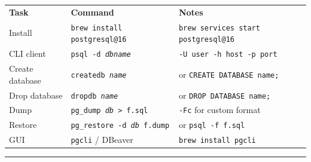 \documentclass[10pt]{extarticle}
\begin{document}
\small


\begin{tabularx}{\linewidth}{@{}l@{\quad}l@{\quad}Y@{}}
\textbf{Task}        & \textbf{Command}                                  & \textbf{Notes} \\[2pt]
Install              & \texttt{brew install postgresql@16}                & \texttt{brew services start postgresql@16} \\
CLI client           & \texttt{psql -d \textit{dbname}}                  & \texttt{-U user -h host -p port} \\
Create database      & \texttt{createdb \textit{name}}                   & or \texttt{CREATE DATABASE name;} \\
Drop database        & \texttt{dropdb \textit{name}}                     & or \texttt{DROP DATABASE name;} \\
Dump                 & \texttt{pg\_dump \textit{db} > f.sql}            & \texttt{-Fc} for custom format \\
Restore              & \texttt{pg\_restore -d \textit{db} f.dump}       & or \texttt{psql -f f.sql} \\
GUI                  & \texttt{pgcli} / DBeaver                          & \texttt{brew install pgcli} \\
\end{tabularx}

\vspace{6pt}
\rule{\linewidth}{0.2pt}
\end{document}
